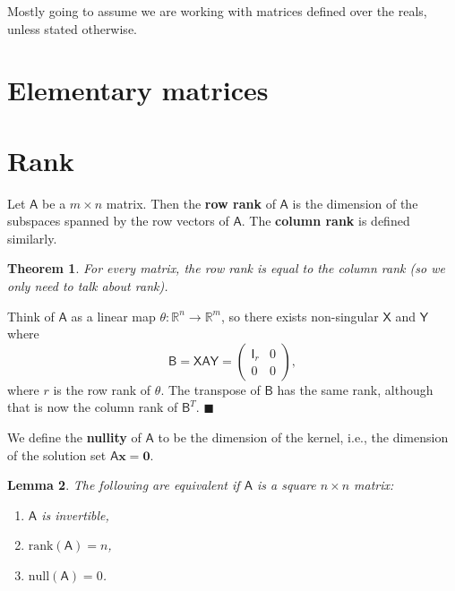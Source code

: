 \documentclass[letter-paper]{tufte-book}
\newtheorem{theorem}{\color{pastel-blue}Theorem}[section]
\newtheorem{lemma}[theorem]{\color{pastel-blue}Lemma}
\newenvironment{proof}[1][Proof]{\begin{trivlist}
\item[\hskip \labelsep {\bfseries #1}]}{\end{trivlist}}
\newcommand{\As}{{\mathsf{A}}}
\newcommand{\Bs}{{\mathsf{B}}}
\newcommand{\Is}{{\mathsf{I}}}
\newcommand{\Xs}{{\mathsf{X}}}
\newcommand{\Ys}{{\mathsf{Y}}}
\newcommand{\Ob}{{\boldsymbol{0}}}
\newcommand{\xb}{{\boldsymbol{x}}}
\newcommand{\qed}{\hfill$\blacksquare$}
\begin{document}
Mostly going to assume we are working with matrices defined over the reals,
unless stated otherwise.


\section{Elementary matrices}


\section{Rank}

Let $\As$ be a $m\times n$ matrix. Then the \textbf{row rank} of $\As$ is the
dimension of the subspaces spanned by the row vectors of $\As$. The
\textbf{column rank} is defined similarly.

\begin{theorem}
  For every matrix, the row rank is equal to the column rank (so we only need to
  talk about \emph{rank}).
\end{theorem}

\begin{proof}
  Think of $\As$ as a linear map $\theta: \mathbb{R}^n \to \mathbb{R}^m$, so
  there exists non-singular $\Xs$ and $\Ys$ where
  \begin{equation*}
    \Bs = \Xs \As \Ys = \begin{pmatrix}\Is_r & 0 \\ 0 & 0 \end{pmatrix},
  \end{equation*}
  where $r$ is the row rank of $\theta$. The transpose of $\Bs$ has the same
  rank, although that is now the column rank of $\Bs^T$. \qed
\end{proof}

We define the \textbf{nullity} of $\As$ to be the dimension of the kernel, i.e.,
the dimension of the solution set $\As\xb = \Ob$.

\begin{lemma}
  The following are equivalent if $\As$ is a square $n\times n$ matrix:
  \begin{enumerate}
    \item $\As$ is invertible,
    \item $\mbox{rank}(\As) = n$,
    \item $\mbox{null}(\As) = 0$.
  \end{enumerate}
\end{lemma}
\end{document}
